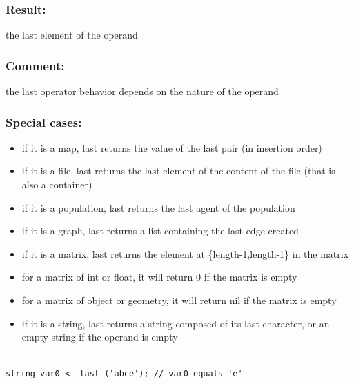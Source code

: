 \documentclass[]{book}
\providecommand{\tightlist}{%
  \setlength{\itemsep}{0pt}\setlength{\parskip}{0pt}}
\theoremstyle{definition}
\theoremstyle{definition}
\theoremstyle{definition}
\theoremstyle{remark}
\begin{document}
\subsubsection{Result:}\label{result-306}

the last element of the operand

\subsubsection{Comment:}\label{comment-56}

the last operator behavior depends on the nature of the operand

\subsubsection{Special cases:}\label{special-cases-84}

\begin{itemize}
\tightlist
\item
  if it is a map, last returns the value of the last pair (in insertion
  order)\\
\item
  if it is a file, last returns the last element of the content of the
  file (that is also a container)\\
\item
  if it is a population, last returns the last agent of the population\\
\item
  if it is a graph, last returns a list containing the last edge
  created\\
\item
  if it is a matrix, last returns the element at \{length-1,length-1\}
  in the matrix\\
\item
  for a matrix of int or float, it will return 0 if the matrix is
  empty\\
\item
  for a matrix of object or geometry, it will return nil if the matrix
  is empty\\
\item
  if it is a string, last returns a string composed of its last
  character, or an empty string if the operand is empty
\end{itemize}

\begin{verbatim}
 
string var0 <- last ('abce'); // var0 equals 'e'
\end{verbatim}
\end{document}
